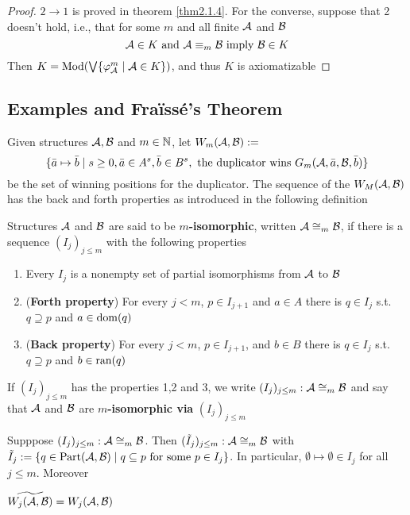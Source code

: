 \documentclass[11pt]{article}
\def \Part {\text{Part}}
\begin{document}
\begin{proof}
\(2\to1\) is proved in theorem \ref{thm2.1.4}. For the converse, suppose that 2 doesn't hold, i.e.,
that for some \(m\) and all finite \(\mathcal{A}\) and \(\mathcal{B}\)
\begin{equation*}
\mathcal{A}\in K\text{ and }\mathcal{A}\equiv_m\mathcal{B}\text{ imply }\mathcal{B}\in K
\end{equation*}
Then \(K=\operatorname{Mod}(\bigvee\{\varphi_{\mathcal{A}}^m\mid \mathcal{A}\in K\})\), and thus \(K\) is axiomatizable
\end{proof}


\subsection{Examples and Fraïssé's Theorem}
\label{sec:orgebfa054}
Given structures \(\mathcal{A},\mathcal{B}\) and \(m\in\mathbb{N}\), let \(W_m(\mathcal{A},\mathcal{B}):=\)
\begin{equation*}
\{\bar{a}\mapsto\bar{b}\mid s\ge0,\bar{a}\in A^s,\bar{b}\in B^s,\text{ the duplicator wins }
G_m(\mathcal{A},\bar{a},\mathcal{B},\bar{b})\}
\end{equation*}
be the set of winning positions for the duplicator. The sequence of the \(W_M(\mathcal{A},\mathcal{B})\) has
the back and forth properties as introduced in the following definition

\begin{definition}[]
Structures \(\mathcal{A}\) and \(\mathcal{B}\) are said to be \textbf{\(m\)-isomorphic},
written \(\mathcal{A}\cong_m\mathcal{B}\), if there is a sequence \((I_j)_{j\le m}\) with the following
properties
\begin{enumerate}
\item Every \(I_j\) is a nonempty set of partial isomorphisms from \(\mathcal{A}\) to \(\mathcal{B}\)
\item (\textbf{Forth property}) For every \(j<m\), \(p\in I_{j+1}\) and \(a\in A\) there is \(q\in I_j\)
s.t. \(q\supseteq p\) and \(a\in\operatorname{dom}(q)\)
\item (\textbf{Back property}) For every \(j<m\), \(p\in I_{j+1}\), and \(b\in B\) there is \(q\in I_j\)
s.t. \(q\supseteq p\) and \(b\in\operatorname{ran}(q)\)
\end{enumerate}


If \((I_j)_{j\le m}\) has the properties 1,2 and 3, we write \((I_j)_{j\le m}:\mathcal{A}\cong_m\mathcal{B}\)
and say that \(\mathcal{A}\) and \(\mathcal{B}\) are \textbf{\(m\)-isomorphic via} \((I_j)_{j\le m}\)
\end{definition}

\begin{exercise}
\label{ex2.3.2}
Supppose \((I_j)_{j\le m}:\mathcal{A}\cong_m\mathcal{B}\).
Then \((\tilde{I}_j)_{j\le m}:\mathcal{A}\cong_m\mathcal{B}\)
with \(\tilde{I}_j:=\{q\in\Part(\cala,\calb)\mid q\subseteq p\text{ for some }p\in I_j\}\).
In particular, \(\emptyset\mapsto\emptyset\in I_j\) for all \(j\le m\). Moreover

\(\widetilde{W_j(\mathcal{A},\mathcal{B})}=W_j(\mathcal{A},\mathcal{B})\)
\end{exercise}
\end{document}
